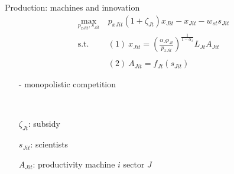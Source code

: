 \documentclass[11pt,aspectratio=169]{beamer}
\begin{document}
\begin{frame}{Production: machines and innovation}
	\vspace{-8mm}
	\begin{align*}
		\underset{p_{xJit}, s_{Jit}}{\max}\ & p_{xJit}(1+\zeta_{Jt})x_{Jit}-x_{Jit}-w_{st}s_{Jit}
		\\ 
		\text{s.t.}\ &(1)\ x_{Jit}=\left(\frac{\alpha_Jp_{Jt}}{p_{xJit}}\right)^{\frac{1}{1-\alpha_J}}L_{Jt}A_{Jit}\\ \ \\ %
		& (2)\ A_{Jit}=f_{Jt}(s_{Jit})%
	\end{align*}
	
	\small
	\vspace{4mm}
	\hspace{-4mm}	\begin{minipage}[t!]{0.32\textwidth}
		\vspace{0mm}
		\begin{itemize}
			\item[-] monopolistic competition 
			\vspace{-4mm}
			\item[] \ 
		\end{itemize}	
	\end{minipage}
	\begin{minipage}[t!]{0.5\textwidth}
		\vspace{0mm}
		\begin{itemize}	
			\item[]$\zeta_{Jt}$: subsidy
			\vspace{-2mm}	
			\item[]$s_{Jit}$: scientists
			\vspace{-2mm}	
			\item[]$A_{Jit}$: productivity machine $i$ sector $J$
		\end{itemize}
	\end{minipage}
\end{frame}
\end{document}

